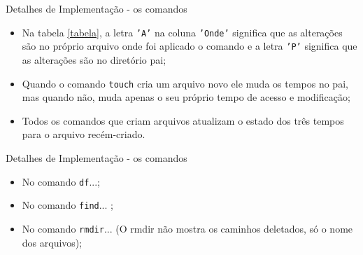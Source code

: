 \documentclass[10pt]{beamer}
\begin{document}
    \begin{frame}{Detalhes de Implementação - os comandos}
        \begin{itemize}
            \justifying
            \item Na tabela \ref{tabela}, a letra \texttt{'A'} na coluna \texttt{'Onde'} significa que as alterações são no próprio arquivo onde foi aplicado o comando e a letra \texttt{'P'} significa que as alterações são no diretório pai;
            \item Quando o comando \texttt{touch} cria um arquivo novo ele muda os tempos no pai, mas quando não, muda apenas o seu próprio tempo de acesso e modificação;
            \item Todos os comandos que criam arquivos atualizam o estado dos três tempos para o arquivo recém-criado.
        \end{itemize}
    \end{frame}
    \begin{frame}{Detalhes de Implementação - os comandos}
        \begin{itemize}
            \justifying
            \item No comando \texttt{df}...;
            \item No comando \texttt{find}... ;
            \item No comando \texttt{rmdir}... (O rmdir não mostra os caminhos deletados, só o nome dos arquivos);
        \end{itemize}
    \end{frame}
\end{document}
